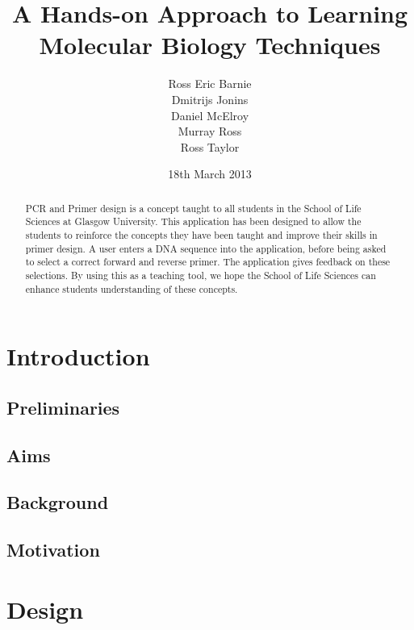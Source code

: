 \documentclass{l3proj}
\title{A Hands-on Approach to Learning Molecular Biology Techniques}
\author{
  Ross Eric Barnie \\
  Dmitrijs Jonins \\
  Daniel McElroy \\
  Murray Ross \\
  Ross Taylor
}
\date{18th March 2013}
\begin{document}
\maketitle
\begin{abstract}

PCR and Primer design is a concept taught to all students in the School of Life Sciences at Glasgow
University. This application has been designed to allow the students to reinforce the concepts they have
been taught and improve their skills in primer design. A user enters a DNA sequence into the application,
before being asked to select a correct forward and reverse primer. The application gives feedback on these
selections. By using this as a teaching tool, we hope the School of Life Sciences
can enhance students understanding of these concepts.

\end{abstract}

\educationalconsent
\tableofcontents

\chapter{Introduction}
\label{intro}

\section{Preliminaries}
\label{intro:prelims}


\section{Aims}
\label{intro:aims}


\section{Background}
\label{intro:background}


\section{Motivation}
\label{intro:motiv}


\chapter{Design}
\label{design}
\end{document}

